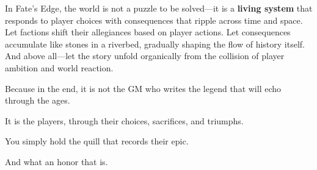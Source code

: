 In Fate's Edge, the world is not a puzzle to be solved---it is a \textbf{living system} that responds to player choices with consequences that ripple across time and space. Let factions shift their allegiances based on player actions. Let consequences accumulate like stones in a riverbed, gradually shaping the flow of history itself. And above all---let the story unfold organically from the collision of player ambition and world reaction.

Because in the end, it is not the GM who writes the legend that will echo through the ages.

It is the players, through their choices, sacrifices, and triumphs.

You simply hold the quill that records their epic.

And what an honor that is.
